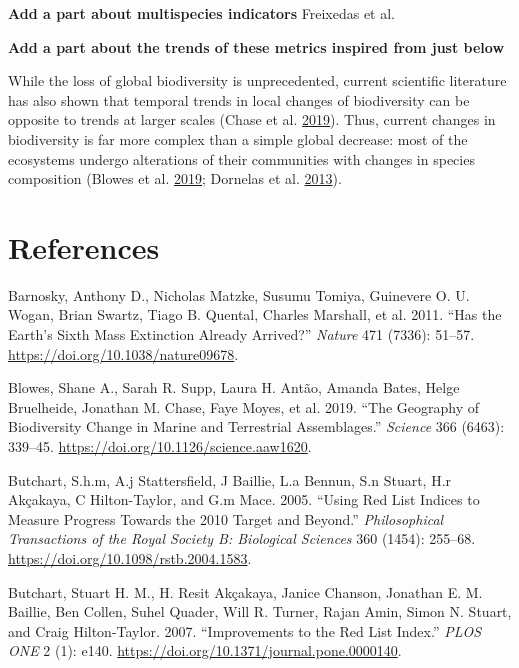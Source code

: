 \documentclass[
  12pt,
  oneside]{report}
\begin{document}
\textbf{Add a part about multispecies indicators} Freixedas et al.

\textbf{Add a part about the trends of these metrics inspired from just below}

While the loss of global biodiversity is unprecedented, current scientific literature has also shown that temporal trends in local changes of biodiversity can be opposite to trends at larger scales (Chase et al. \protect\hyperlink{ref-chase_species_2019}{2019}). Thus, current changes in biodiversity is far more complex than a simple global decrease: most of the ecosystems undergo alterations of their communities with changes in species composition (Blowes et al. \protect\hyperlink{ref-blowes_geography_2019}{2019}; Dornelas et al. \protect\hyperlink{ref-dornelas_quantifying_2013}{2013}).

\hypertarget{references}{%
\chapter*{References}\label{references}}

\singlespacing

\hypertarget{refs}{}
\leavevmode\hypertarget{ref-barnosky_has_2011}{}%
Barnosky, Anthony D., Nicholas Matzke, Susumu Tomiya, Guinevere O. U. Wogan, Brian Swartz, Tiago B. Quental, Charles Marshall, et al. 2011. ``Has the Earth's Sixth Mass Extinction Already Arrived?'' \emph{Nature} 471 (7336): 51--57. \url{https://doi.org/10.1038/nature09678}.

\leavevmode\hypertarget{ref-blowes_geography_2019}{}%
Blowes, Shane A., Sarah R. Supp, Laura H. Antão, Amanda Bates, Helge Bruelheide, Jonathan M. Chase, Faye Moyes, et al. 2019. ``The Geography of Biodiversity Change in Marine and Terrestrial Assemblages.'' \emph{Science} 366 (6463): 339--45. \url{https://doi.org/10.1126/science.aaw1620}.

\leavevmode\hypertarget{ref-butchart_using_2005}{}%
Butchart, S.h.m, A.j Stattersfield, J Baillie, L.a Bennun, S.n Stuart, H.r Akçakaya, C Hilton-Taylor, and G.m Mace. 2005. ``Using Red List Indices to Measure Progress Towards the 2010 Target and Beyond.'' \emph{Philosophical Transactions of the Royal Society B: Biological Sciences} 360 (1454): 255--68. \url{https://doi.org/10.1098/rstb.2004.1583}.

\leavevmode\hypertarget{ref-butchart_improvements_2007}{}%
Butchart, Stuart H. M., H. Resit Akçakaya, Janice Chanson, Jonathan E. M. Baillie, Ben Collen, Suhel Quader, Will R. Turner, Rajan Amin, Simon N. Stuart, and Craig Hilton-Taylor. 2007. ``Improvements to the Red List Index.'' \emph{PLOS ONE} 2 (1): e140. \url{https://doi.org/10.1371/journal.pone.0000140}.
\end{document}
